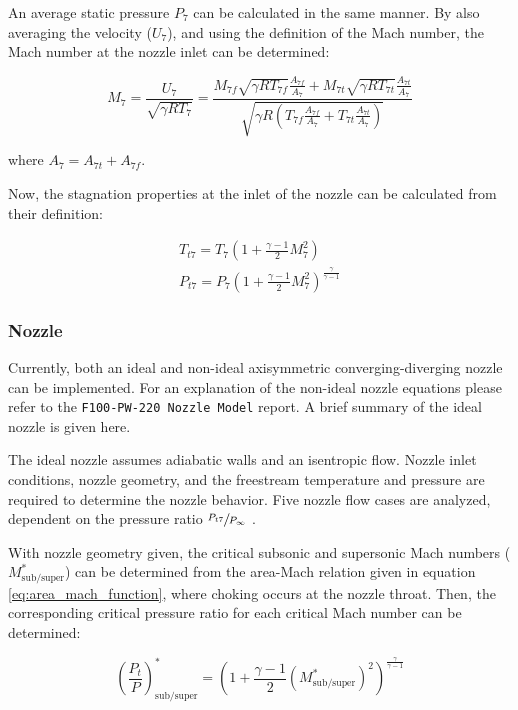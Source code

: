 \documentclass{article}
\begin{document}
An average static pressure $P_7$ can be calculated in the same manner. By also averaging the velocity ($U_7$), and using the definition of the Mach number, the Mach number at the nozzle inlet can be determined:

\begin{equation}
M_7 = \frac{U_7}{\sqrt{\gamma R T_7}} = 
\frac{ M_{7f} \sqrt{\gamma R T_{7f}} \frac{A_{7f}}{A_7}  + M_{7t} \sqrt{\gamma R T_{7t}} \frac{A_{7t}}{A_7} } 
{ \sqrt{\gamma R \left( T_{7f} \frac{A_{7f}}{A_7} + T_{7t} \frac{A_{7t}}{A_7} \right)}}
\end{equation}

where $A_7 = A_{7t} + A_{7f}$. 

Now, the stagnation properties at the inlet of the nozzle can be calculated from their definition:

\begin{gather}
T_{t7} = T_7 \left( 1 + \frac{\gamma - 1}{2} M_7^2 \right) \\
P_{t7} = P_7 \left( 1 + \frac{\gamma - 1}{2} M_7^2 \right)^{\frac{\gamma}{\gamma - 1}} 
\end{gather}

\subsubsection{Nozzle}

Currently, both an ideal and non-ideal axisymmetric converging-diverging nozzle can be implemented. For an explanation of the non-ideal nozzle equations please refer to the \texttt{F100-PW-220 Nozzle Model} report. A brief summary of the ideal nozzle is given here. 

The ideal nozzle assumes adiabatic walls and an isentropic flow. Nozzle inlet conditions, nozzle geometry, and the freestream temperature and pressure are required to determine the nozzle behavior. Five nozzle flow cases are analyzed, dependent on the pressure ratio $\sfrac{P_{t7}}{P_{\infty}}$ \cite{cantwell210}.

With nozzle geometry given, the critical subsonic and supersonic Mach numbers ($M_{\textrm{sub/super}}^*$) can be determined from the area-Mach relation given in equation \ref{eq:area_mach_function}, where choking occurs at the nozzle throat. Then, the corresponding critical pressure ratio for each critical Mach number can be determined:

\begin{equation}
\left( \frac{P_t}{P} \right)_{\textrm{sub/super}}^* = \left( 1 + \frac{\gamma - 1}{2} \left(M_{\textrm{sub/super}}^*\right)^2 \right)^\frac{\gamma}{\gamma - 1}
\end{equation}
\end{document}
